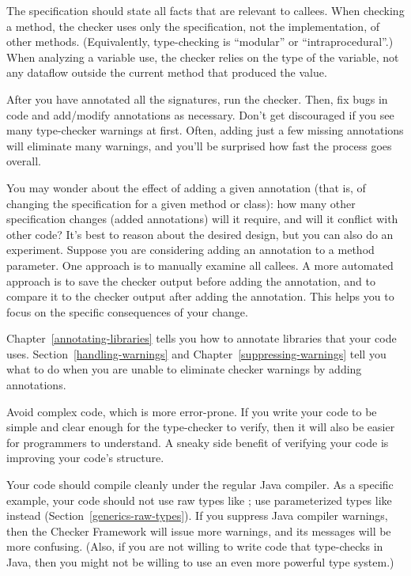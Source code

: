 The specification should state all facts that are relevant to callees.
When checking a method, the checker uses only the specification, not the
implementation, of other methods.  (Equivalently, type-checking is
``modular'' or ``intraprocedural''.)  When analyzing a variable use, the
checker relies on the type of the variable, not any dataflow outside the
current method that produced the value.

After you have annotated all the signatures, run the checker.
Then, fix bugs in code and add/modify annotations as necessary.
Don't get discouraged if you see many type-checker warnings at first.
Often, adding just a few missing annotations will eliminate many warnings,
and you'll be surprised how fast the process goes overall.

You may wonder about the effect of adding a given annotation (that is, of
changing the specification for a given method or class):  how many
other specification changes (added annotations) will it require, and will
it conflict with other code?  It's best to reason about the desired design,
but you can also do an experiment.
Suppose you are considering adding an annotation to a method parameter.
One approach is to manually examine all callees.
A more automated approach is to save the checker
output before adding the annotation, and to compare it to the checker
output after adding the annotation.  This helps you to focus on the
specific consequences of your change.

Chapter~\ref{annotating-libraries} tells you how to annotate libraries that
your code uses.  Section~\ref{handling-warnings} and
Chapter~\ref{suppressing-warnings} tell you what to do when you are unable
to eliminate checker warnings by adding annotations.



Avoid complex code, which is more error-prone.  If you write your code to
be simple and clear enough for the type-checker to verify, then it will
also be easier for programmers to understand.  A sneaky side benefit of
verifying your code is improving your code's structure.

Your code should compile cleanly under the regular Java compiler.  As a
specific example, your code should not use raw types like ; use
parameterized types like  instead
(Section~\ref{generics-raw-types}).  If you suppress Java compiler
warnings, then the Checker Framework will issue more warnings, and its
messages will be more confusing.  (Also, if you are not willing to write
code that type-checks in Java, then you might not be willing to use an even
more powerful type system.)

